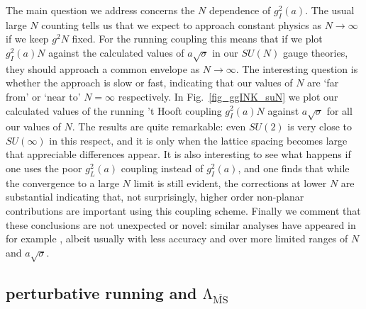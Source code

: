 \documentclass[12pt]{article}
\begin{document}
The main question we address concerns the $N$ dependence of $g^2_I(a)$. The usual large $N$
counting tells us that we expect to approach constant physics as $N\to\infty$ if we
keep $g^2N$ fixed. For the running coupling this means that if we plot $g^2_I(a)N$
against the calculated values of $a\surd\sigma$ in our $SU(N)$ gauge theories, they
should approach a common envelope as $N\to\infty$. The interesting question is whether
the approach is slow or fast, indicating that our values of $N$ are `far from' or `near to'
$N=\infty$ respectively. In Fig.~\ref{fig_ggINK_suN} we plot our calculated values of the
running 't Hooft coupling $g^2_I(a)N$ against $a\surd\sigma$ for all our values of $N$.
The results are quite remarkable: even $SU(2)$ is very close to $SU(\infty)$ in this respect,
and it is only when the lattice spacing becomes large that appreciable differences appear.
It is also interesting to see what happens if
one uses the poor $g^2_L(a)$ coupling instead of $g^2_I(a)$, and one finds that
while the convergence to a large $N$ limit is still evident,
the corrections at lower $N$ are substantial indicating that, not surprisingly, higher order
non-planar contributions are important using this coupling scheme. Finally we comment
that these conclusions are not unexpected or novel: similar analyses have appeared in
for example 
%
\cite{BLMT_N,CAMTAT},
%
albeit usually with less accuracy and over more limited ranges of $N$ and $a\surd\sigma$.



%
%
\subsection{perturbative running and ${\mathrm{\Lambda_{\overline{MS}}}}$}
\label{subsection_Lambda}
\end{document}
